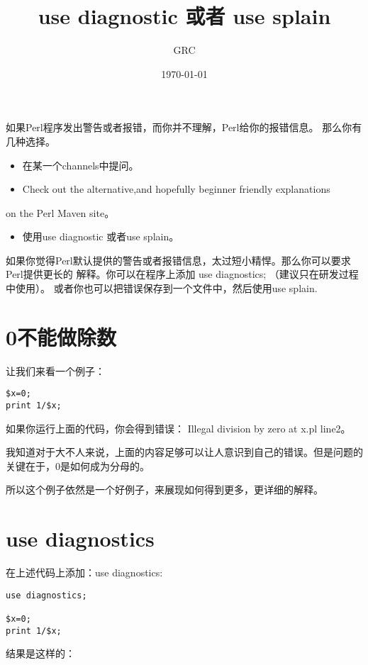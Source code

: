 \documentclass{ctexart}
\title{use diagnostic 或者 use splain}
\author{GRC}
\date{\today}
\begin{document}
\maketitle

\setcounter{tocdepth}{3}
\tableofcontents
\vspace*{1cm}

如果Perl程序发出警告或者报错，而你并不理解，Perl给你的报错信息。
那么你有几种选择。

\begin{itemize}
\item 在某一个channels中提问。
\item Check out the alternative,and hopefully beginner friendly explanations
\end{itemize}
on the Perl Maven site。
\begin{itemize}
\item 使用use diagnostic 或者use splain。
\end{itemize}

如果你觉得Perl默认提供的警告或者报错信息，太过短小精悍。那么你可以要求Perl提供更长的
解释。你可以在程序上添加 use diagnostics; （建议只在研发过程中使用）。
或者你也可以把错误保存到一个文件中，然后使用use splain.

\section{0不能做除数}
\label{sec-1}

让我们来看一个例子：

\begin{lstlisting}
$x=0;
print 1/$x;
\end{lstlisting}
如果你运行上面的代码，你会得到错误：
Illegal division by zero at x.pl line2。

我知道对于大不人来说，上面的内容足够可以让人意识到自己的错误。但是问题的
关键在于，0是如何成为分母的。

所以这个例子依然是一个好例子，来展现如何得到更多，更详细的解释。
\section{use diagnostics}
\label{sec-2}

在上述代码上添加：use diagnostics:

\begin{lstlisting}
use diagnostics;

$x=0;
print 1/$x;
\end{lstlisting}
结果是这样的：
\end{document}
